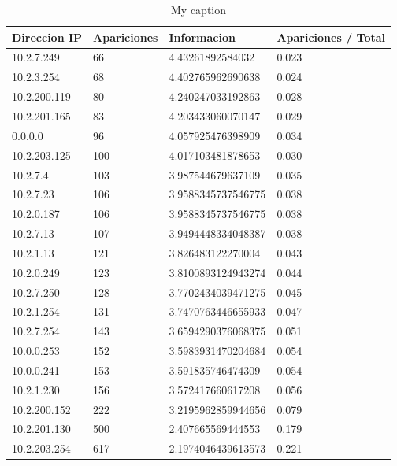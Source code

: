 \begin{table}[H]
\centering
\caption{My caption}
\label{my-label}
\begin{tabular}{@{}llll@{}}
\toprule
Direccion IP & Apariciones & Informacion        & Apariciones / Total \\ \midrule
10.2.7.249   & 66          & 4.43261892584032   & 0.023               \\
10.2.3.254   & 68          & 4.402765962690638  & 0.024               \\
10.2.200.119 & 80          & 4.240247033192863  & 0.028               \\
10.2.201.165 & 83          & 4.203433060070147  & 0.029               \\
0.0.0.0      & 96          & 4.057925476398909  & 0.034               \\
10.2.203.125 & 100         & 4.017103481878653  & 0.030               \\
10.2.7.4     & 103         & 3.987544679637109  & 0.035               \\
10.2.7.23    & 106         & 3.9588345737546775 & 0.038               \\
10.2.0.187   & 106         & 3.9588345737546775 & 0.038               \\
10.2.7.13    & 107         & 3.9494448334048387 & 0.038               \\
10.2.1.13    & 121         & 3.826483122270004  & 0.043               \\
10.2.0.249   & 123         & 3.8100893124943274 & 0.044               \\
10.2.7.250   & 128         & 3.7702434039471275 & 0.045               \\
10.2.1.254   & 131         & 3.7470763446655933 & 0.047               \\
10.2.7.254   & 143         & 3.6594290376068375 & 0.051               \\
10.0.0.253   & 152         & 3.5983931470204684 & 0.054               \\
10.0.0.241   & 153         & 3.591835746474309  & 0.054               \\
10.2.1.230   & 156         & 3.572417660617208  & 0.056               \\
10.2.200.152 & 222         & 3.2195962859944656 & 0.079               \\
10.2.201.130 & 500         & 2.407665569444553  & 0.179               \\
10.2.203.254 & 617         & 2.1974046439613573 & 0.221               \\ \bottomrule
\end{tabular}
\end{table}

